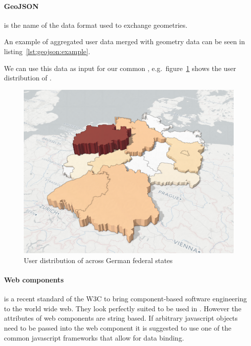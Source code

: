 \paragraph{GeoJSON} is the name of the data format used to exchange geometries.

An example of aggregated user data merged with geometry data can be seen in listing~\ref{lst:geojson:example}.


We can use this data as input for our common \visan{}, e.g.\ figure~\ref{fig:implementation:user_distribution} shows the user distribution of \rufu{}.

\begin{figure}[h!]
  \centering
  \includegraphics[width=\textwidth]{images/ua_example.png}
  \caption{%
    User distribution of \rufu{} across German federal states
  }\label{fig:implementation:user_distribution}
\end{figure}

\paragraph{Web components} is a recent standard of the W3C\cite{W3C2017} to bring component-based software engineering to the world wide web.
They look perfectly suited to be used in \cmvs{}.
However the attributes of web components are string based.
If arbitrary javascript objects need to be passed into the web component it is suggested to use one of the common javascript frameworks that allow for data binding.

